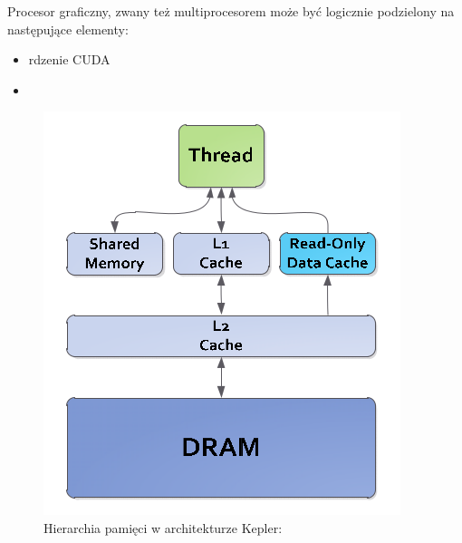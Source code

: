 Procesor graficzny, zwany też multiprocesorem może być logicznie
podzielony na następujące elementy:
\begin{itemize}
\item rdzenie CUDA
\item 
\end{itemize}

\begin{figure}[ht]
\centering
\includegraphics[scale=0.4]{images/memory-hierarchy2.png}
\caption{Hierarchia pamięci w architekturze Kepler: \cite{kepler}}
\label{hierarchiaKepler}
\end{figure}

